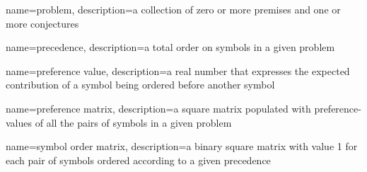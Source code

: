 \usepackage{glossaries}
\makeglossaries


{
	name=problem,
	description={a collection of zero or more premises and one or more conjectures}
}

{
	name=precedence,
	description={a total order on symbols in a given \gls{problem}}
}

{
	name=preference value,
	description={a real number that expresses the expected contribution of a symbol being ordered before another symbol}
}

{
	name=preference matrix,
	description={a square matrix populated with \glspl{preference-value} of all the pairs of symbols in a given \gls{problem}}
}

{
	name=symbol order matrix,
	description={a binary square matrix with value 1 for each pair of symbols ordered according to a given \gls{precedence}}
}
